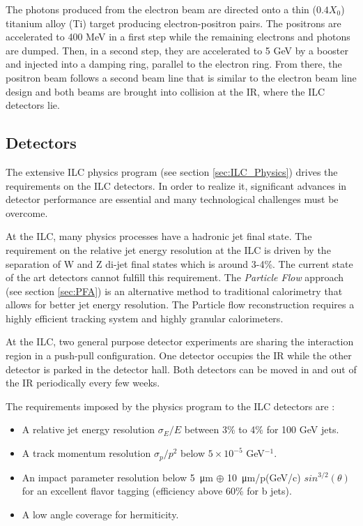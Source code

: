 The photons produced from the electron beam are directed onto a thin ($0.4 X_0$) titanium alloy (Ti) target producing elec\-tron\--positron pairs. The positrons are accelerated to 400 MeV in a first step while the remaining electrons and photons are dumped. Then, in a second step, they are accelerated to 5 GeV by a booster and injected into a damping ring, parallel to the electron ring. From there, the positron beam follows a second beam line that is similar to the electron beam line design and both beams are brought into collision at the IR, where the ILC detectors lie.

\subsection{Detectors}

The extensive ILC physics program (see section \ref{sec:ILC_Physics}) drives the requirements on the ILC detectors. In order to realize it, significant advances in detector performance are essential and many technological challenges must be overcome.

At the ILC, many physics processes have a hadronic jet final state. The requirement on the relative jet energy resolution at the ILC is driven by the separation of W and Z di-jet final states which is around 3-4\%. The current state of the art detectors cannot fulfill this requirement. The \textit{Particle Flow} approach (see section \ref{sec:PFA}) is an alternative method to traditional calorimetry that allows for better jet energy resolution. The Particle flow reconstruction requires a highly efficient tracking system and highly granular calorimeters.

At the ILC, two general purpose detector experiments are sharing the interaction region in a push-pull configuration. One detector occupies the IR while the other detector is parked in the detector hall. Both detectors can be moved in and out of the IR periodically every few weeks.

The requirements imposed by the physics program to the ILC detectors are \cite{ILC_TDR_Vol4}:
\begin{itemize}
  \item A relative jet energy resolution $\sigma_{E}/E$ between 3\% to 4\% for 100 GeV jets.
  \item A track momentum resolution $\sigma_{p}/p^2$ below $5 \times 10^{-5}$ GeV$^{-1}$.
  \item An impact parameter resolution below \SI{5}{\micro\meter} $\oplus$ \SI{10}{\micro\meter}/p(GeV/c) $sin^{3/2}(\theta)$ for an excellent flavor tagging (efficiency above 60\% for b jets).
  \item A low angle coverage for hermiticity.
\end{itemize}

